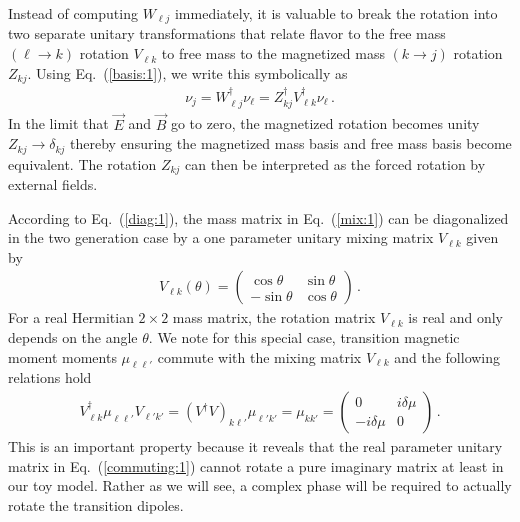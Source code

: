 \documentclass[addchapnum]{ws-rv961x669} %
\newcommand{\req}[1]{Eq.~(\ref{#1})}
\begin{document}
Instead of computing $W_{\ell j}$ immediately, it is valuable to break the rotation into two separate unitary transformations that relate flavor to the free mass $(\ell\rightarrow k)$ rotation $V_{\ell k}$ to free mass to the magnetized mass $(k\rightarrow j)$ rotation $Z_{kj}$. Using \req{basis:1}, we write this symbolically as
\begin{align}
    \label{zrot:1}
    \nu_{j} = W^{\dag}_{\ell j}\nu_{\ell} = Z_{kj}^{\dag}V_{\ell k}^{\dag}\nu_{\ell}\,.
\end{align}
In the limit that $\vec{E}$ and $\vec{B}$ go to zero, the magnetized rotation becomes unity $Z_{kj}\rightarrow\delta_{kj}$ thereby ensuring the magnetized mass basis and free mass basis become equivalent. The rotation $Z_{kj}$ can then be interpreted as the forced rotation by external fields.

According to \req{diag:1}, the mass matrix in \req{mix:1} can be diagonalized in the two generation case by a one parameter unitary mixing matrix $V_{\ell k}$ given by
\begin{align}
    \label{rot:1}
    V_{\ell k}(\theta)=
    \begin{pmatrix}
        \cos\theta & \sin\theta\\
        -\sin\theta & \cos\theta
    \end{pmatrix}\,.
\end{align}
For a real Hermitian $2\times 2$ mass matrix, the rotation matrix $V_{\ell k}$ is real and only depends on the angle $\theta$. We note for this special case, transition magnetic moment moments $\mu_{\ell\ell'}$ commute with the mixing matrix $V_{\ell k}$ and the following relations hold
\begin{align}
    \label{commuting:1}
    V_{\ell k}^{\dag}\mu_{\ell\ell'}V_{\ell' k'}=(V^{\dag}V)_{k\ell'}\mu_{\ell'k'}=\mu_{kk'}=
    \begin{pmatrix}
        0 & i\delta\mu\\
        -i\delta\mu & 0
    \end{pmatrix}\,.
\end{align}
This is an important property because it reveals that the real parameter unitary matrix in \req{commuting:1} cannot rotate a pure imaginary matrix at least in our toy model. Rather as we will see, a complex phase will be required to actually rotate the transition dipoles. 
\end{document}
